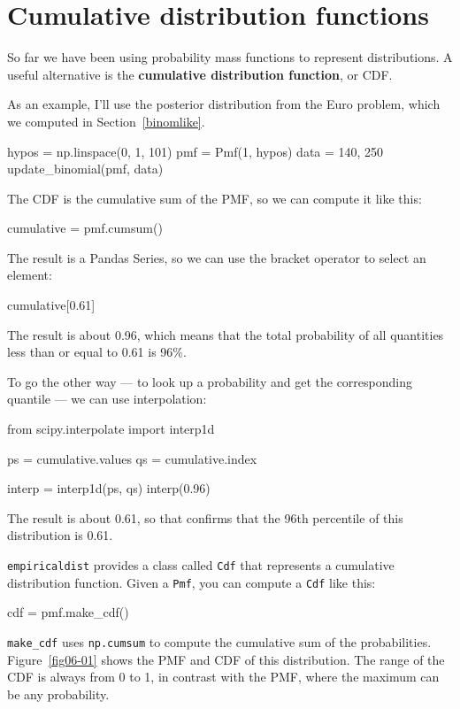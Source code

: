 \documentclass[12pt]{book}
\theoremstyle{exercise}
\newcommand{\py}[1]{{\tt #1}}%
\begin{document}
\section{Cumulative distribution functions}

So far we have been using probability mass functions to represent distributions.
A useful alternative is the {\bf cumulative distribution function}, or CDF.

As an example, I'll use the posterior distribution from the Euro problem, which we computed in Section~\ref{binomlike}.

\begin{code}
hypos = np.linspace(0, 1, 101)
pmf = Pmf(1, hypos)
data = 140, 250
update_binomial(pmf, data)
\end{code}

The CDF is the cumulative sum of the PMF, so we can compute it like this:

\begin{code}
cumulative = pmf.cumsum()
\end{code}

The result is a Pandas Series, so we can use the bracket operator to select an element:

\begin{code}
cumulative[0.61]
\end{code}

The result is about 0.96, which means that the total probability of all quantities less than or equal to 0.61 is 96\%.

To go the other way --- to look up a probability and get the corresponding quantile --- we can use interpolation:

\begin{code}
from scipy.interpolate import interp1d

ps = cumulative.values
qs = cumulative.index

interp = interp1d(ps, qs)
interp(0.96)
\end{code}

The result is about 0.61, so that confirms that the 96th percentile of this distribution is 0.61.

\py{empiricaldist} provides a class called \py{Cdf} that represents a cumulative distribution function.
Given a \py{Pmf}, you can compute a \py{Cdf} like this:

\begin{code}
cdf = pmf.make_cdf()
\end{code}

\py{make_cdf} uses \py{np.cumsum} to compute the cumulative sum of the probabilities.
Figure~\ref{fig06-01} shows the PMF and CDF of this distribution.
The range of the CDF is always from 0 to 1, in contrast with the PMF, where the maximum can be any probability.
\end{document}
